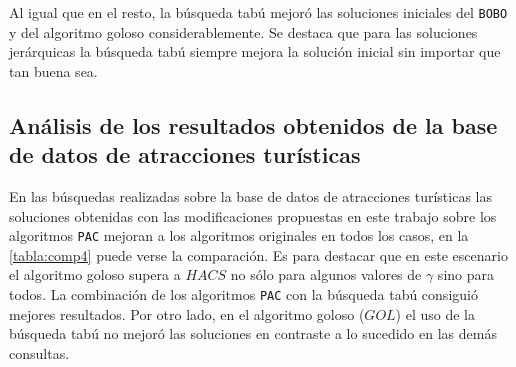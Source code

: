 Al igual que en el resto, la búsqueda tabú mejoró las soluciones iniciales del \texttt{BOBO} y del algoritmo goloso considerablemente. Se destaca que para las soluciones jerárquicas la búsqueda tabú siempre mejora la solución inicial sin importar que tan buena sea.
\begin{table}[H]
\begin{center}
\caption{Comparación de calidad de soluciones entre algoritmos para la \hyperref[busqueda:universidades]{búsqueda de universidades}} 
\end{center}
\end{table}
\subsection{Análisis de los resultados obtenidos de la base de datos de atracciones turísticas}\label{res:busAtracciones}
En las búsquedas realizadas sobre la base de datos de atracciones turísticas las soluciones obtenidas con las modificaciones propuestas en este trabajo sobre los algoritmos \texttt{PAC} mejoran a los algoritmos originales en todos los casos, en la \autoref{tabla:comp4} puede verse la comparación. Es para destacar que en este escenario el algoritmo goloso supera a $HACS$ no sólo para algunos valores de $\gamma$ sino para todos. La combinación de los algoritmos \texttt{PAC} con la búsqueda tabú consiguió mejores resultados. Por otro lado, en el algoritmo goloso ($GOL$) el uso de la búsqueda tabú no mejoró las soluciones en contraste a lo sucedido en las demás consultas.

